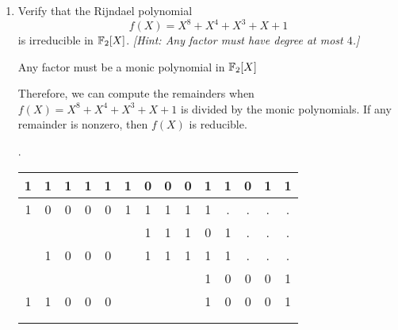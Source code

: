 \begin{problem}
\begin{enumerate}

\newpage
\item Verify that the Rijndael polynomial 
\[ f(X)=X^8+X^4+X^3+X+1 \] is irreducible in $\mathbb{F}_2[X]$.  
\emph{[Hint: Any factor must have degree at most $4$.]}

\begin{Answer}
Any factor must be a monic polynomial in $\mathbb{F}_{2}[X]$

\noindent
Therefore, we can compute the remainders when $f(X)=X^8+X^4+X^3+X+1$ is divided by
the monic polynomials. If any remainder is nonzero, then $f(X)$ is reducible.

\begin{multicols}{3}
\noindent
{}.
\newline
\color{zaffre}
\begin{tabular}{c@{\,}c@{\,}c@{\,}c@{\,}c@{\,}|c@{\,}c@{\,}c@{\,}c@{\,}c@{\,}c@{\,}c@{\,}c@{\,}c@{\,}}
  1 & 1 & 1 & 1 & 1     & 1 & 0 & 0 & 0 & 1 & 1 & 0 & 1 & 1\\
\hline{}
  1 & 0 & 0 & 0 & 0     & 1 & 1 & 1 & 1 & 1 &.  &.  &.  &. \\
    &   &   &   &       &   & 1 & 1 & 1 & 0 & 1 &.  &.  &. \\
    & 1 & 0 & 0 & 0     &   & 1 & 1 & 1 & 1 & 1 &.  &.  &. \\
    &   &   &   &       &   &   &   &   & 1 & 0 & 0 & 0 & 1\\
\hline{}
  1 & 1 & 0 & 0 & 0     &   &   &   &   & 1 & 0 & 0 & 0 & 1\\
\\
\\
\end{tabular}
\color{black}


\end{multicols}
\end{Answer}
\end{enumerate}
\end{problem}
